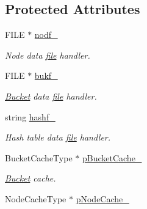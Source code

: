\subsection*{Protected Attributes}
\begin{CompactItemize}
\item 
\hypertarget{classBTrie_282779241215a40bd6f64c26c4bb6b67}{
FILE $\ast$ \hyperlink{classBTrie_282779241215a40bd6f64c26c4bb6b67}{nodf\_\-}}
\label{classBTrie_282779241215a40bd6f64c26c4bb6b67}

\begin{CompactList}\small\item\em Node data \hyperlink{classfile}{file} handler. \item\end{CompactList}\item 
\hypertarget{classBTrie_790e90901c61010abf817786d0a72af2}{
FILE $\ast$ \hyperlink{classBTrie_790e90901c61010abf817786d0a72af2}{bukf\_\-}}
\label{classBTrie_790e90901c61010abf817786d0a72af2}

\begin{CompactList}\small\item\em \hyperlink{classBucket}{Bucket} data \hyperlink{classfile}{file} handler. \item\end{CompactList}\item 
\hypertarget{classBTrie_121b3b835910ac94754c123e38b9c982}{
string \hyperlink{classBTrie_121b3b835910ac94754c123e38b9c982}{hashf\_\-}}
\label{classBTrie_121b3b835910ac94754c123e38b9c982}

\begin{CompactList}\small\item\em Hash table data \hyperlink{classfile}{file} handler. \item\end{CompactList}\item 
\hypertarget{classBTrie_60b3acb7798110d53ec589d6929ab1ae}{
BucketCacheType $\ast$ \hyperlink{classBTrie_60b3acb7798110d53ec589d6929ab1ae}{pBucketCache\_\-}}
\label{classBTrie_60b3acb7798110d53ec589d6929ab1ae}

\begin{CompactList}\small\item\em \hyperlink{classBucket}{Bucket} cache. \item\end{CompactList}\item 
\hypertarget{classBTrie_a24075704dcb542c7edec0f6b8d7f008}{
NodeCacheType $\ast$ \hyperlink{classBTrie_a24075704dcb542c7edec0f6b8d7f008}{pNodeCache\_\-}}
\label{classBTrie_a24075704dcb542c7edec0f6b8d7f008}


\end{CompactItemize}
